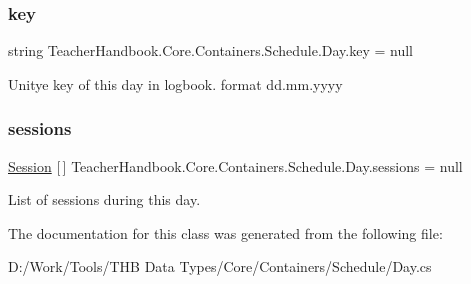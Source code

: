 \subsubsection{\texorpdfstring{key}{key}}
{\footnotesize\ttfamily string Teacher\+Handbook.\+Core.\+Containers.\+Schedule.\+Day.\+key = null}



Unitye key of this day in logbook. format dd.\+mm.\+yyyy 

\mbox{\label{class_teacher_handbook_1_1_core_1_1_containers_1_1_schedule_1_1_day_ab7130291674ea826085d0090d6acdddb}} 
\subsubsection{\texorpdfstring{sessions}{sessions}}
{\footnotesize\ttfamily \mbox{\hyperlink{class_teacher_handbook_1_1_core_1_1_containers_1_1_schedule_1_1_session}{Session}} \mbox{[}$\,$\mbox{]} Teacher\+Handbook.\+Core.\+Containers.\+Schedule.\+Day.\+sessions = null}



List of sessions during this day. 



The documentation for this class was generated from the following file\+:\begin{DoxyCompactItemize}
\item 
D\+:/\+Work/\+Tools/\+T\+H\+B Data Types/\+Core/\+Containers/\+Schedule/Day.\+cs\end{DoxyCompactItemize}
